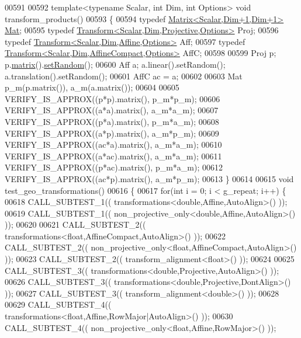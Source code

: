 \begin{DoxyCode}
00591 
00592 \textcolor{keyword}{template}<\textcolor{keyword}{typename} Scalar, \textcolor{keywordtype}{int} Dim, \textcolor{keywordtype}{int} Options> \textcolor{keywordtype}{void} transform\_products()
00593 \{
00594   \textcolor{keyword}{typedef} \hyperlink{group___core___module_class_eigen_1_1_matrix}{Matrix<Scalar,Dim+1,Dim+1>} \hyperlink{group___core___module}{Mat};
00595   \textcolor{keyword}{typedef} \hyperlink{group___geometry___module_class_eigen_1_1_transform}{Transform<Scalar,Dim,Projective,Options>} Proj;
00596   \textcolor{keyword}{typedef} \hyperlink{group___geometry___module_class_eigen_1_1_transform}{Transform<Scalar,Dim,Affine,Options>} Aff;
00597   \textcolor{keyword}{typedef} \hyperlink{group___geometry___module_class_eigen_1_1_transform}{Transform<Scalar,Dim,AffineCompact,Options>} AffC;
00598 
00599   Proj p; p.\hyperlink{group___geometry___module_aec8168000a88a807130d41020af98d47}{matrix}().\hyperlink{class_eigen_1_1_plain_object_base_af0e576a0e1aefc9ee346de44cc352ba3}{setRandom}();
00600   Aff a; a.linear().setRandom(); a.translation().setRandom();
00601   AffC ac = a;
00602 
00603   Mat p\_m(p.matrix()), a\_m(a.matrix());
00604 
00605   VERIFY\_IS\_APPROX((p*p).matrix(), p\_m*p\_m);
00606   VERIFY\_IS\_APPROX((a*a).matrix(), a\_m*a\_m);
00607   VERIFY\_IS\_APPROX((p*a).matrix(), p\_m*a\_m);
00608   VERIFY\_IS\_APPROX((a*p).matrix(), a\_m*p\_m);
00609   VERIFY\_IS\_APPROX((ac*a).matrix(), a\_m*a\_m);
00610   VERIFY\_IS\_APPROX((a*ac).matrix(), a\_m*a\_m);
00611   VERIFY\_IS\_APPROX((p*ac).matrix(), p\_m*a\_m);
00612   VERIFY\_IS\_APPROX((ac*p).matrix(), a\_m*p\_m);
00613 \}
00614 
00615 \textcolor{keywordtype}{void} test\_geo\_transformations()
00616 \{
00617   \textcolor{keywordflow}{for}(\textcolor{keywordtype}{int} i = 0; i < g\_repeat; i++) \{
00618     CALL\_SUBTEST\_1(( transformations<double,Affine,AutoAlign>() ));
00619     CALL\_SUBTEST\_1(( non\_projective\_only<double,Affine,AutoAlign>() ));
00620     
00621     CALL\_SUBTEST\_2(( transformations<float,AffineCompact,AutoAlign>() ));
00622     CALL\_SUBTEST\_2(( non\_projective\_only<float,AffineCompact,AutoAlign>() ));
00623     CALL\_SUBTEST\_2(( transform\_alignment<float>() ));
00624     
00625     CALL\_SUBTEST\_3(( transformations<double,Projective,AutoAlign>() ));
00626     CALL\_SUBTEST\_3(( transformations<double,Projective,DontAlign>() ));
00627     CALL\_SUBTEST\_3(( transform\_alignment<double>() ));
00628     
00629     CALL\_SUBTEST\_4(( transformations<float,Affine,RowMajor|AutoAlign>() ));
00630     CALL\_SUBTEST\_4(( non\_projective\_only<float,Affine,RowMajor>() ));

\end{DoxyCode}
